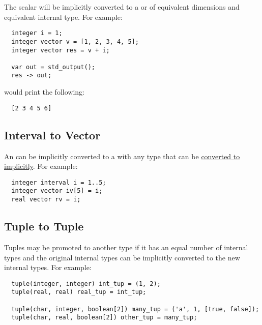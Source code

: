 \documentclass[../gazprea.tex]{subfiles}
\begin{document}
The scalar will be implicitly converted to a  or  of equivalent dimensions
and equivalent internal type. For example:
\begin{lstlisting}
  integer i = 1;
  integer vector v = [1, 2, 3, 4, 5];
  integer vector res = v + i;

  var out = std_output();
  res -> out;
\end{lstlisting}

would print the following:
\begin{lstlisting}
  [2 3 4 5 6]
\end{lstlisting}

\subsection{Interval to Vector}
\label{ssec:typePromotion_ivltov}
An  can be implicitly converted to a  with any type that 
can be \hyperref[ssec:typePromotion_scalar]{converted to implicitly}. For example:
\begin{lstlisting}
  integer interval i = 1..5;
  integer vector iv[5] = i;
  real vector rv = i;
\end{lstlisting}

\subsection{Tuple to Tuple}
\label{ssec:typePromotion_ttot}
Tuples may be promoted to another type if it has an equal number of internal types and the original
internal types can be implicitly converted to the new internal types. For example:
\begin{lstlisting}
  tuple(integer, integer) int_tup = (1, 2);
  tuple(real, real) real_tup = int_tup;

  tuple(char, integer, boolean[2]) many_tup = ('a', 1, [true, false]);
  tuple(char, real, boolean[2]) other_tup = many_tup;
\end{lstlisting}
\end{document}
